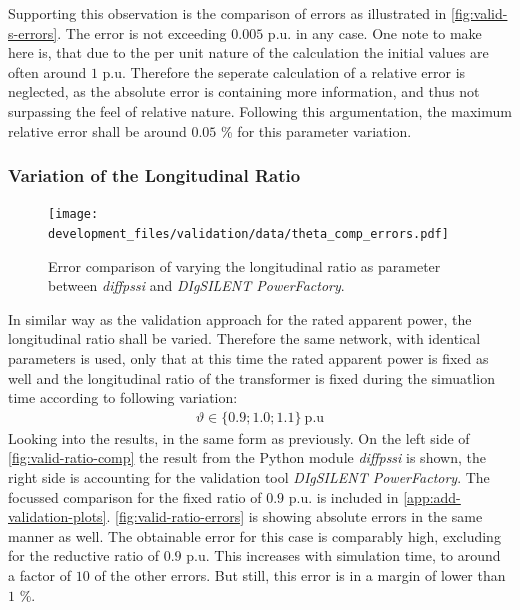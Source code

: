 Supporting this observation is the comparison of errors as illustrated in \autoref{fig:valid-s-errors}.
The error is not exceeding $0.005$ p.u. in any case.
One note to make here is, that due to the per unit nature of the calculation the initial values are often around $1$ p.u.
Therefore the seperate calculation of a relative error is neglected, as the absolute error is containing more information, and thus not surpassing the feel of relative nature.
Following this argumentation, the maximum relative error shall be around $0.05$ \% for this parameter variation.

\subsubsection{Variation of the Longitudinal Ratio}

\begin{figure}[htbp!]
    \centering
    \texttt{[image: development\_files/validation/data/theta\_comp\_errors.pdf]}
    \caption{Error comparison of varying the longitudinal ratio as parameter between \textit{diffpssi} and \textit{DIgSILENT PowerFactory}.}
    \label{fig:valid-ratio-errors}
\end{figure}

In similar way as the validation approach for the rated apparent power, the longitudinal ratio shall be varied. 
Therefore the same network, with identical parameters is used, only that at this time the rated apparent power is fixed as well and the longitudinal ratio of the transformer is fixed during the simuatlion time according to following variation:
\begin{align}
    \vartheta \in \{ 0.9; 1.0; 1.1 \}~\mathrm{p.u} \label{eq:variation-ratio}
\end{align}
Looking into the results, in the same form as previously.
On the left side of \autoref{fig:valid-ratio-comp} the result from the Python module \textit{diffpssi} is shown, the right side is accounting for the validation tool \textit{DIgSILENT PowerFactory}.
The focussed comparison for the fixed ratio of $0.9$ p.u. is included in \autoref{app:add-validation-plots}.
\autoref{fig:valid-ratio-errors} is showing absolute errors in the same manner as well.
The obtainable error for this case is comparably high, excluding for the reductive ratio of $0.9$ p.u.
This increases with simulation time, to around a factor of $10$ of the other errors. 
But still, this error is in a margin of lower than $1$ \%. 


